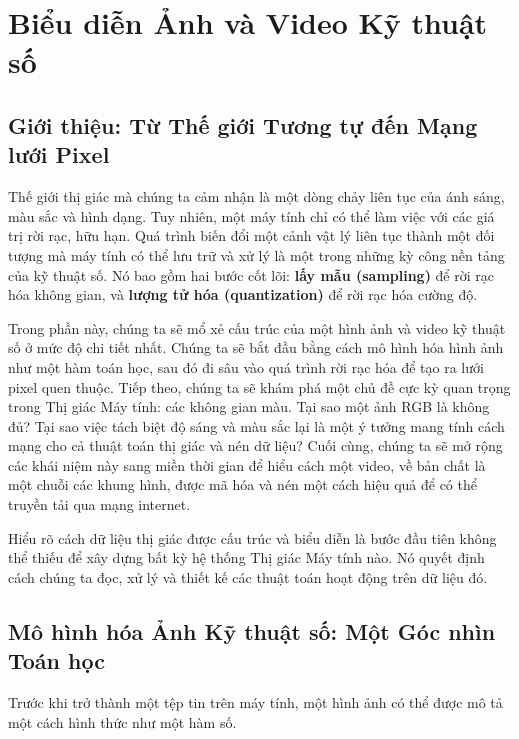 \section{Biểu diễn Ảnh và Video Kỹ thuật số}
\label{sec:digital_image_and_video_representation}

\subsection{Giới thiệu: Từ Thế giới Tương tự đến Mạng lưới Pixel}
\label{subsec:analog_to_digital_intro}

Thế giới thị giác mà chúng ta cảm nhận là một dòng chảy liên tục của ánh sáng, màu sắc và hình dạng. Tuy nhiên, một máy tính chỉ có thể làm việc với các giá trị rời rạc, hữu hạn. Quá trình biến đổi một cảnh vật lý liên tục thành một đối tượng mà máy tính có thể lưu trữ và xử lý là một trong những kỳ công nền tảng của kỹ thuật số. Nó bao gồm hai bước cốt lõi: \textbf{lấy mẫu (sampling)} để rời rạc hóa không gian, và \textbf{lượng tử hóa (quantization)} để rời rạc hóa cường độ.

Trong phần này, chúng ta sẽ mổ xẻ cấu trúc của một hình ảnh và video kỹ thuật số ở mức độ chi tiết nhất. Chúng ta sẽ bắt đầu bằng cách mô hình hóa hình ảnh như một hàm toán học, sau đó đi sâu vào quá trình rời rạc hóa để tạo ra lưới pixel quen thuộc. Tiếp theo, chúng ta sẽ khám phá một chủ đề cực kỳ quan trọng trong Thị giác Máy tính: các không gian màu. Tại sao một ảnh RGB là không đủ? Tại sao việc tách biệt độ sáng và màu sắc lại là một ý tưởng mang tính cách mạng cho cả thuật toán thị giác và nén dữ liệu? Cuối cùng, chúng ta sẽ mở rộng các khái niệm này sang miền thời gian để hiểu cách một video, về bản chất là một chuỗi các khung hình, được mã hóa và nén một cách hiệu quả để có thể truyền tải qua mạng internet.

Hiểu rõ cách dữ liệu thị giác được cấu trúc và biểu diễn là bước đầu tiên không thể thiếu để xây dựng bất kỳ hệ thống Thị giác Máy tính nào. Nó quyết định cách chúng ta đọc, xử lý và thiết kế các thuật toán hoạt động trên dữ liệu đó.

\subsection{Mô hình hóa Ảnh Kỹ thuật số: Một Góc nhìn Toán học}
\label{subsec:digital_image_modeling}

Trước khi trở thành một tệp tin trên máy tính, một hình ảnh có thể được mô tả một cách hình thức như một hàm số.

